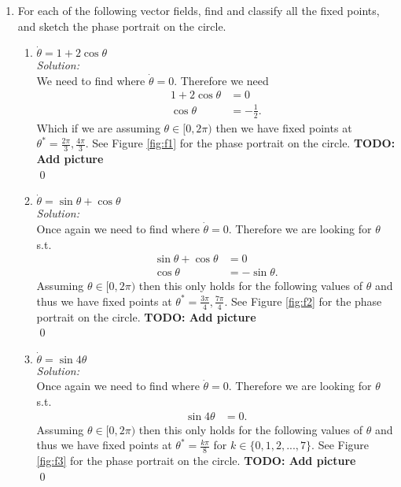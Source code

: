 \documentclass[10pt]{amsart}
\theoremstyle{nonumberplain}
\begin{document}
\begin{enumerate}[label={\bf {\arabic*}:}]
\item For each of the following vector fields, find and classify all the fixed points, and
sketch the phase portrait on the circle. \\
\begin{enumerate}

\item $\dot \theta = 1 + 2 \cos \theta$ \\
\textit{Solution:} \\
We need to find where $\dot \theta = 0$.
Therefore we need 
\begin{align*}
1 + 2 \cos \theta &= 0 \\
\cos \theta &= -\frac 1 2.
\end{align*}
Which if we are assuming $\theta \in [0, 2 \pi)$ then we have fixed points at $\theta^* = \frac {2 \pi} 3, \frac {4 \pi} 3$.
See Figure \ref{fig:f1} for the phase portrait on the circle. \textbf{TODO: Add picture} \\
\qed \\

\item $\dot \theta = \sin \theta + \cos \theta$ \\
\textit{Solution:} \\
Once again we need to find where $\dot \theta = 0$.
Therefore we are looking for $\theta$ s.t.
\begin{align*}
\sin \theta + \cos \theta &= 0 \\
\cos \theta &= -\sin \theta.
\end{align*}
Assuming $\theta \in [0, 2 \pi)$ then this only holds for the following values of $\theta$ and thus we have fixed points at $\theta^* = \frac {3 \pi} 4, \frac {7 \pi} 4$.
See Figure \ref{fig:f2} for the phase portrait on the circle. \textbf{TODO: Add picture} \\
\qed \\

\item $\dot \theta = \sin 4 \theta$ \\
\textit{Solution:} \\
Once again we need to find where $\dot \theta = 0$.
Therefore we are looking for $\theta$ s.t.
\begin{align*}
\sin 4 \theta &= 0.
\end{align*}
Assuming $\theta \in [0, 2 \pi)$ then this only holds for the following values of $\theta$ and thus we have fixed points at $\theta^* = \frac {k \pi} 8$ for $k \in \{0, 1, 2, ..., 7\}$.
See Figure \ref{fig:f3} for the phase portrait on the circle. \textbf{TODO: Add picture} \\
\qed \\


\end{enumerate}
\end{enumerate}
\end{document}
